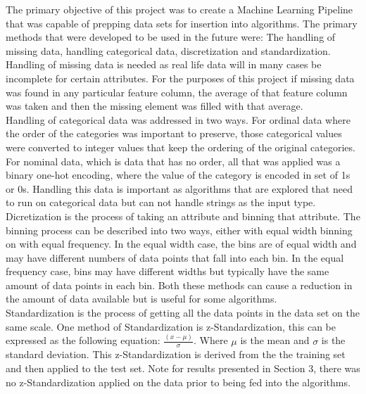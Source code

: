 \documentclass[twoside,11pt]{article}
\begin{document}
The primary objective of this project was to create a Machine Learning Pipeline that was capable of prepping data sets for insertion into algorithms. The primary methods that were developed to be used in the future were: The handling of missing data, handling categorical data, discretization and standardization.\\
\hspace*{10mm}Handling of missing data is needed as real life data will in many cases be incomplete for certain attributes. For the purposes of this project if missing data was found in any particular feature column, the average of that feature column was taken and then the missing element was filled with that average.\\ 
\hspace*{10mm} Handling of categorical data was addressed in two ways. For ordinal data where the order of the categories was important to preserve, those categorical values were converted to integer values that keep the ordering of the original categories. For nominal data, which is data that has no order, all that was applied was a binary one-hot encoding, where the value of the category is encoded in set of 1s or 0s. Handling this data is important as algorithms that are explored that need to run on categorical data but can not handle strings as the input type.\\
\hspace*{10mm}Dicretization is the process of taking an attribute and binning that attribute. The binning process can be described into two ways, either with equal width binning on with equal frequency. In the equal width case, the bins are of equal width and may have different numbers of data points that fall into each bin. In the equal frequency case, bins may have different widths but typically have the same amount of data points in each bin. Both these methods can cause a reduction in the amount of data available but is useful for some algorithms.\\
\hspace*{10mm} Standardization is the process of getting all the data points in the data set on the same scale. One method of Standardization is z-Standardization, this can be expressed as the following equation: \( \frac{(x-\mu)}{\sigma} \). Where $\mu$ is the mean and $\sigma$ is the standard deviation. This z-Standardization is derived from the the training set and then applied to the test set. Note for results presented in Section 3, there was no z-Standardization applied on the data prior to being fed into the algorithms. 
\end{document}
